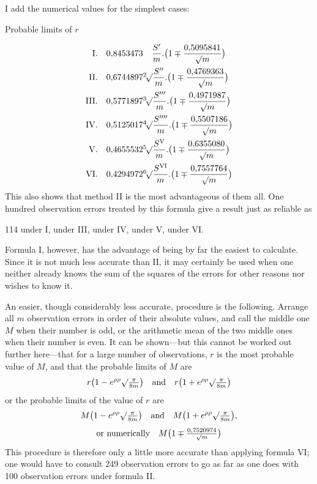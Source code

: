 I add the numerical values for the simplest cases:
\begin{center}Probable limits of \(r\)\end{center}
\[
\begin{array}{r@{\quad}l}
\mathrm{I}.&0{,}8453473\quad\dfrac{S'}m.\bigl(1\mp\dfrac{0{,}5095841}{\surd m}\bigr)\\[10pt]
\mathrm{II}.&0{,}6744897\BareRoot[2]{\dfrac{S''}m}.\bigl(1\mp\dfrac{0{,}4769363}{\surd m}\bigr)\\[10pt]
\mathrm{III}.&0{,}5771897\BareRoot[3]{\dfrac{S'''}m}.\bigl(1\mp\dfrac{0{,}4971987}{\surd m}\bigr)\\[10pt]
\mathrm{IV}.&0{,}5125017\BareRoot[4]{\dfrac{S''''}m}.\bigl(1\mp\dfrac{0{,}5507186}{\surd m}\bigr)\\[10pt]
\mathrm{V}.&0{,}4655532\BareRoot[5]{\dfrac{S^{\mathrm V}}m}.\bigl(1\mp\dfrac{0{,}6355080}{\surd m}\bigr)\\[10pt]
\mathrm{VI}.&0{,}4294972\BareRoot[6]{\dfrac{S^{\mathrm{VI}}}m}.\bigl(1\mp\dfrac{0{,}7557764}{\surd m}\bigr)
\end{array}
\]
This also shows that method II is the most advantageous of them all. One hundred observation errors treated by this formula give a result just as reliable as
\begin{center}
114 under I, under III, under IV, under V, under VI.
\end{center}
Formula I, however, has the advantage of being by far the easiest to calculate. Since it is not much less accurate than II, it may certainly be used when one neither already knows the sum of the squares of the errors for other reasons nor wishes to know it.

An easier, though considerably less accurate, procedure is the following. Arrange all \(m\) observation errors in order of their absolute values, and call the middle one \(M\) when their number is odd, or the arithmetic mean of the two middle ones when their number is even. It can be shown—but this cannot be worked out further here—that for a large number of observations, \(r\) is the most probable value of \(M\), and that the probable limits of \(M\) are
\[
r\bigl(1-e^{\rho\rho}\surd\tfrac\pi{8m}\bigr)\quad\text{and}\quad r\bigl(1+e^{\rho\rho}\surd\tfrac\pi{8m}\bigr)
\]
or the probable limits of the value of \(r\) are
\[
\begin{gathered}
M\bigl(1-e^{\rho\rho}\surd\tfrac\pi{8m}\bigr)\quad\text{and}\quad M\bigl(1+e^{\rho\rho}\surd\tfrac\pi{8m}\bigr),\\[4pt]
\text{or numerically}\quad M\bigl(1\mp\tfrac{0{,}7520974}{\surd m}\bigr)
\end{gathered}
\]
This procedure is therefore only a little more accurate than applying formula VI; one would have to consult 249 observation errors to go as far as one does with 100 observation errors under formula II.

